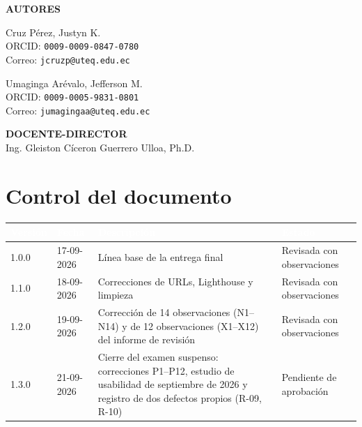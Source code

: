 \documentclass[11pt,a4paper]{article}
\begin{document}
\begin{titlepage}
    {\Large \textbf{AUTORES}}\\[0.5cm]
    \begin{minipage}{0.45\textwidth}
        \centering
        {\large Cruz Pérez, Justyn K.}\\[0.1cm]
        {\small ORCID: \texttt{0009-0009-0847-0780}}\\[0.1cm]
        {\small Correo: \texttt{jcruzp@uteq.edu.ec}}
    \end{minipage}
    \hfill
    \begin{minipage}{0.45\textwidth}
        \centering
        {\large Umaginga Arévalo, Jefferson M.}\\[0.1cm]
        {\small ORCID: \texttt{0009-0005-9831-0801}}\\[0.1cm]
        {\small Correo: \texttt{jumagingaa@uteq.edu.ec}}
    \end{minipage}
    \vspace{1cm}

    {\Large \textbf{DOCENTE-DIRECTOR}}\\[0.2cm]
    {\large Ing. Gleiston Cíceron Guerrero Ulloa, Ph.D.}\\[0.5cm]

    
\end{titlepage}

\newpage
\tableofcontents
\newpage

\section*{Control del documento}

\begin{table}[h]
    \centering
    \renewcommand{\arraystretch}{1.5}
    \begin{tabularx}{\textwidth}{@{}|l|l|X|l|@{}}
        \hline
        \rowcolor{uteqblue}
        \textcolor{white}{\textbf{Versión}} & \textcolor{white}{\textbf{Fecha}} & \textcolor{white}{\textbf{Descripción}} & \textcolor{white}{\textbf{Estado}} \\ \hline
        1.0.0 & 17-09-2026 & Línea base de la entrega final & Revisada con observaciones \\ \hline
        1.1.0 & 18-09-2026 & Correcciones de URLs, Lighthouse y limpieza & Revisada con observaciones \\ \hline
        1.2.0 & 19-09-2026 & Corrección de 14 observaciones (N1–N14) y de 12 observaciones (X1–X12) del informe de revisión & Revisada con observaciones \\ \hline
        1.3.0 & 21-09-2026 & Cierre del examen suspenso: correcciones P1–P12, estudio de usabilidad de septiembre de 2026 y registro de dos defectos propios (R-09, R-10) & Pendiente de aprobación \\ \hline
    \end{tabularx}
\end{table}
\end{document}

